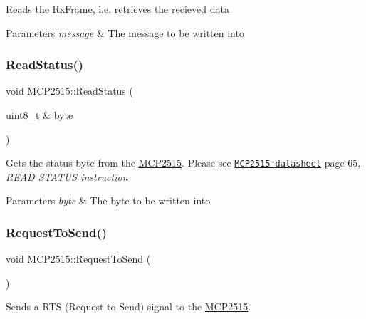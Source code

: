 Reads the Rx\+Frame, i.\+e. retrieves the recieved data 
\begin{DoxyParams}{Parameters}
{\em message} & The message to be written into \\
\hline
\end{DoxyParams}
\hypertarget{class_m_c_p2515_ae466f10eea5ccf0f36439757d4baf6b5}{}\label{class_m_c_p2515_ae466f10eea5ccf0f36439757d4baf6b5} 
\subsubsection{\texorpdfstring{Read\+Status()}{ReadStatus()}}
{\footnotesize\ttfamily void M\+C\+P2515\+::\+Read\+Status (\begin{DoxyParamCaption}\item[{uint8\+\_\+t \&}]{byte }\end{DoxyParamCaption})\hspace{0.3cm}{\ttfamily [private]}}

Gets the status byte from the \hyperlink{class_m_c_p2515}{M\+C\+P2515}. Please see \href{http://ww1.microchip.com/downloads/en/DeviceDoc/21801G.pdf}{\tt M\+C\+P2515 datasheet} page 65, {\itshape R\+E\+AD S\+T\+A\+T\+US instruction} 
\begin{DoxyParams}{Parameters}
{\em byte} & The byte to be written into \\
\hline
\end{DoxyParams}
\hypertarget{class_m_c_p2515_a5a218199ca1dfcb25cb95890bc0220fc}{}\label{class_m_c_p2515_a5a218199ca1dfcb25cb95890bc0220fc} 
\subsubsection{\texorpdfstring{Request\+To\+Send()}{RequestToSend()}}
{\footnotesize\ttfamily void M\+C\+P2515\+::\+Request\+To\+Send (\begin{DoxyParamCaption}{ }\end{DoxyParamCaption})\hspace{0.3cm}{\ttfamily [private]}}

Sends a R\+TS (Request to Send) signal to the \hyperlink{class_m_c_p2515}{M\+C\+P2515}. \hypertarget{class_m_c_p2515_aa4d4138b984dc87116cf72ae104acb70}{}\label{class_m_c_p2515_aa4d4138b984dc87116cf72ae104acb70} 
